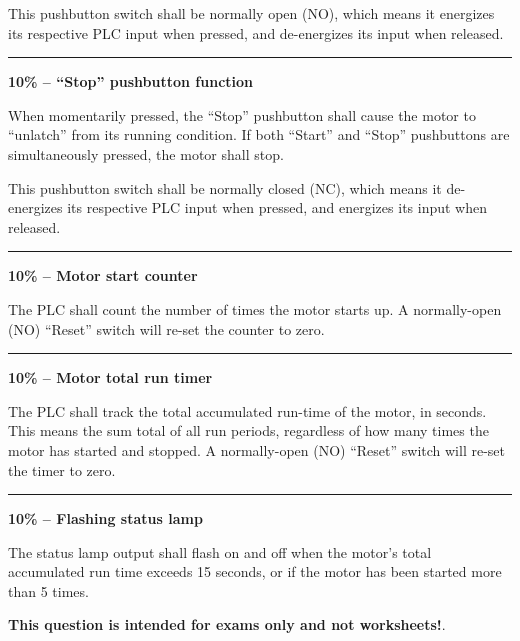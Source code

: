 This pushbutton switch shall be normally open (NO), which means it energizes its respective PLC input when pressed, and de-energizes its input when released.

\vskip 10pt
\hrule
\vskip 10pt

\noindent
{\bf 10\% -- ``Stop'' pushbutton function}

When momentarily pressed, the ``Stop'' pushbutton shall cause the motor to ``unlatch'' from its running condition.  If both ``Start'' and ``Stop'' pushbuttons are simultaneously pressed, the motor shall stop.

This pushbutton switch shall be normally closed (NC), which means it de-energizes its respective PLC input when pressed, and energizes its input when released.

\vskip 10pt
\hrule
\vskip 10pt

\noindent
{\bf 10\% -- Motor start counter}

The PLC shall count the number of times the motor starts up.  A normally-open (NO) ``Reset''  switch will re-set the counter to zero.

\vskip 10pt
\hrule
\vskip 10pt

\noindent
{\bf 10\% -- Motor total run timer}

The PLC shall track the total accumulated run-time of the motor, in seconds.  This means the sum total of all run periods, regardless of how many times the motor has started and stopped.  A normally-open (NO) ``Reset''  switch will re-set the timer to zero.

\vskip 10pt
\hrule
\vskip 10pt

\noindent
{\bf 10\% -- Flashing status lamp}

The status lamp output shall flash on and off when the motor's total accumulated run time exceeds 15 seconds, or if the motor has been started more than 5 times.

\vfil \eject














{\bf This question is intended for exams only and not worksheets!}.


